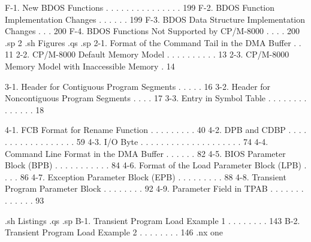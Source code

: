      F-1.  New BDOS Functions  . . . . . . . . . . . . . . .  199
     F-2.  BDOS Function Implementation Changes  . . . . . .  199
     F-3.  BDOS Data Structure Implementation Changes  . . .  200
     F-4.  BDOS Functions Not Supported by CP/M-8000  . . . .  200
.sp 2
.sh
Figures
.qs
.sp
     2-1.  Format of the Command Tail in the DMA Buffer  . .   11
     2-2.  CP/M-8000 Default Memory Model . . . . . . . . . .   13
     2-3.  CP/M-8000 Memory Model with Inaccessible Memory  .   14

     3-1.  Header for Contiguous Program Segments  . . . . .   16
     3-2.  Header for Noncontiguous Program Segments . . . .   17
     3-3.  Entry in Symbol Table . . . . . . . . . . . . . .   18

     4-1.  FCB Format for Rename Function  . . . . . . . . .   40
     4-2.  DPB and CDBP  . . . . . . . . . . . . . . . . . .   59
     4-3.  I/O Byte  . . . . . . . . . . . . . . . . . . . .   74
     4-4.  Command Line Format in the DMA Buffer . . . . . .   82
     4-5.  BIOS Parameter Block (BPB)  . . . . . . . . . . .   84
     4-6.  Format of the Load Parameter Block (LPB)  . . . .   86
     4-7.  Exception Parameter Block (EPB) . . . . . . . . .   88
     4-8.  Transient Program Parameter Block . . . . . . . .   92
     4-9.  Parameter Field in TPAB . . . . . . . . . . . . .   93


.sh
Listings
.qs
.sp
     B-1.  Transient Program Load Example 1  . . . . . . . .  143
     B-2.  Transient Program Load Example 2  . . . . . . . .  146
.nx one



